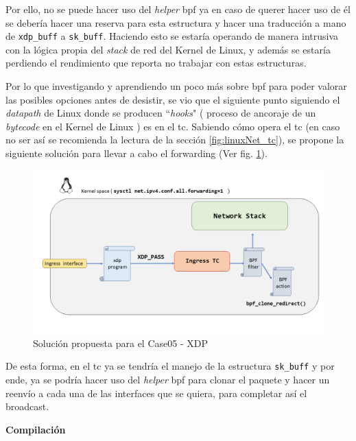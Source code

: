Por ello, no se puede hacer uso del \textit{helper} \gls{bpf} ya en caso de querer hacer uso de él se debería hacer una reserva para esta estructura y hacer una traducción a mano de \texttt{xdp\_buff} a \texttt{sk\_buff}. Haciendo esto se estaría operando de manera intrusiva con la lógica propia del \textit{stack} de red del Kernel de Linux, y además se estaría perdiendo el rendimiento que reporta no trabajar con estas estructuras.

Por lo que investigando y aprendiendo un poco más sobre \gls{bpf} para poder valorar las posibles opciones antes de desistir, se vio que el siguiente punto siguiendo el \textit{datapath} de Linux donde se producen ``\textit{hooks}" ( proceso de ancoraje de un \textit{bytecode} en el Kernel de Linux ) es en el \gls{tc}. Sabiendo cómo opera el \gls{tc} (en caso no ser así se recomienda la lectura de la
sección \ref{fig:linuxNet_tc}), se propone la siguiente solución para llevar a cabo el forwarding (Ver fig. \ref{fig:case05_xdp_ether_scenario3}).

\begin{figure}[ht]
    \centering
    \includegraphics[width=16cm]{archivos/img/dev/xdp/case05/scenario_04.png}
    \caption{Solución propuesta para el Case05 - XDP}
    \label{fig:case05_xdp_ether_scenario3}
\end{figure}

De esta forma, en el \gls{tc} ya se tendría el manejo de la estructura \texttt{sk\_buff} y por ende, ya se podría hacer uso del \textit{helper} \gls{bpf} para clonar el paquete y hacer un reenvío a cada una de las interfaces que se quiera, para completar así el broadcast.


\vspace{1cm}
\textbf{Compilación}\\
\par

